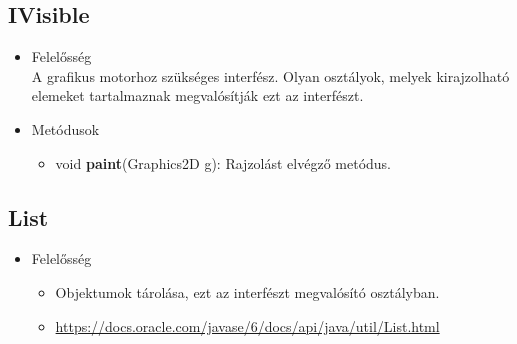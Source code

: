 \subsection{IVisible}
\begin{itemize}
\item Felelősség\\
A grafikus motorhoz szükséges interfész. Olyan osztályok, melyek kirajzolható elemeket tartalmaznak megvalósítják ezt az interfészt.
\item Metódusok
	\begin{itemize}
		\item void \textbf{paint}(Graphics2D g): Rajzolást elvégző metódus.
	\end{itemize}
\end{itemize}

\subsection{List}
\begin{itemize}
    \item Felelősség
        \begin{itemize}
        \item Objektumok tárolása, ezt az interfészt megvalósító osztályban.
        \item \url{https://docs.oracle.com/javase/6/docs/api/java/util/List.html}
        \end{itemize}
\end{itemize}

